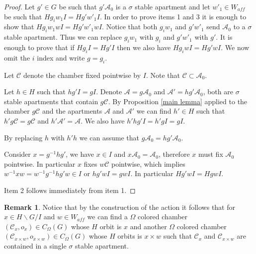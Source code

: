 \documentclass[12pt]{article}
\newcommand{\A}{\mathcal{A}}
\newcommand{\C}{\mathcal{C}}
\newcommand{\<}{\langle}
\renewcommand{\>}{\rangle}
\theoremstyle{plain}
\theoremstyle{definition}
\newtheorem{Remark}[theorem]{Remark}
\begin{document}
\begin{proof}
    Let $g'\in G$ be such that $g'\A_0$ is a $\sigma$ stable apartment and let $w'_1\in W_{aff}$ be such that $Hg_iw_1I=Hg'w'_1I$. In order to prove items 1 and 3 it is enough to show that $Hg_iw_1wI=Hg'w'_1wI$. Notice that both $g_iw_1$ and $g'w'_1$ send $\A_0$ to a $\sigma$ stable apartment. Thus we can replace $g_iw_1$ with $g_i$ and $g'w'_1$ with $g'$. It is enough to prove that 
 if $Hg_iI=Hg'I$ then we also have $Hg_iwI=Hg'wI$. We now omit the $i$ index and write $g=g_i$.

 Let $\C$ denote the chamber fixed pointwise by $I$. Note that $\C\subset \A_0$.

 Let $h\in H$ such that $hg'I=gI$. Denote $\A=g\A_0$ and $\A'=hg'\A_0$, both are $\sigma$ stable apartments that contain $g\C$. By Proposition \ref{main lemma} applied to the chamber $g\C$ and the apartments $\A$ and $\A'$ we can find $h'\in H$ such that $h'g\C=g\C$ and $h'\A'=\A$. We also have $h'hg'I=h'gI=gI$.
 
 By replacing $h$ with $h'h$ we can assume that $g\A_0=hg'\A_0$. 
 
 
 Consider $x=g^{-1}hg'$, we have $x\in I$ and $x\A_0=\A_0$, therefore $x$ must fix $\A_0$ pointwise. In particular $x$ fixes $w\C$ pointwise, which implies $w^{-1}xw=w^{-1}g^{-1}hg'w\in I$ or $hg'wI=gwI$. In particular $Hg'wI=HgwI$.

 Item 2 follows immediately from item 1.
\end{proof}






\begin{Remark}\label{3.5}
Notice that by the construction of the action it follows that for $x\in H\backslash G/I$ and $w\in W_{aff}$ we can find a $\Omega$ colored chamber $(\C_x,o_x)\in C_\Omega(G)$ whose $H$ orbit is $x$ and another $\Omega$ colored chamber $(\C_{x\times w},o_{x\times w})\in C_\Omega(G)$ whose $H$ orbits is $x\times w$ such that $\C_x$ and $\C_{x\times w}$ are contained in a single $\sigma$ stable apartment.
\end{Remark}
\end{document}
